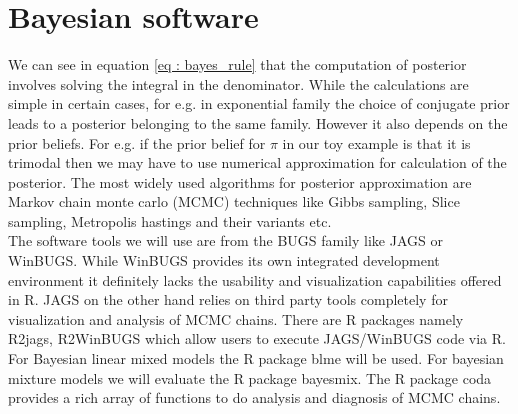 \section{Bayesian software}
We can see in equation \ref{eq : bayes_rule} that the computation of posterior involves solving the integral in the denominator. While the calculations are simple in certain cases, for e.g. in exponential family the choice of conjugate prior leads to a posterior belonging to the same family. However it also depends on the prior beliefs. For e.g. if the prior belief for $\pi$ in our toy example is that it is trimodal then we may have to use numerical approximation for calculation of the posterior. The most widely used algorithms for posterior approximation are Markov chain monte carlo (MCMC) techniques like Gibbs sampling, Slice sampling, Metropolis hastings and their variants etc.\\

The software tools we will use are from the BUGS family like JAGS or WinBUGS. While WinBUGS provides its own integrated development environment it definitely lacks the usability and visualization capabilities offered in R. JAGS on the other hand relies on third party tools completely for visualization and analysis of MCMC chains. There are R packages namely R2jags, R2WinBUGS which allow users to execute JAGS/WinBUGS code via R. For Bayesian linear mixed models the R package blme will be used. For bayesian mixture models we will evaluate the R package bayesmix. The R package coda provides a rich array of functions to do analysis and diagnosis of MCMC chains.\\